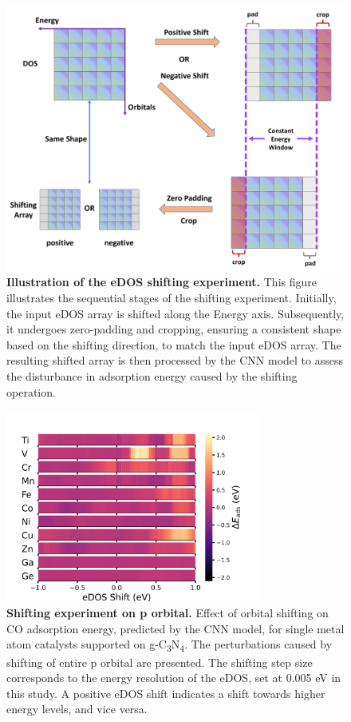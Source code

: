 \begin{figure}[htbp]
  \centering
  \includegraphics[width=\textwidth]{supp_fig30_shifting.png}
  \caption{\textbf{Illustration of the eDOS shifting experiment.}
  This figure illustrates the sequential stages of the shifting experiment.
  Initially, the input eDOS array is shifted along the Energy axis.
  Subsequently, it undergoes zero-padding and cropping,
  ensuring a consistent shape based on the shifting direction, to match the input eDOS array.
  The resulting shifted array is then processed by the CNN model to
  assess the disturbance in adsorption energy caused by the shifting operation.}
  \label{supp_fig30:shifting}
\end{figure}

\begin{figure}[htbp]
  \centering
  \includegraphics[width=0.75\textwidth]{supp_fig31_p_shifting.png}
  \caption{\textbf{Shifting experiment on p orbital.}
  Effect of orbital shifting on CO adsorption energy, predicted by the CNN model,
  for single metal atom catalysts supported on g-C\textsubscript{3}N\textsubscript{4}.
  The perturbations caused by shifting of entire p orbital are presented.
  The shifting step size corresponds to the energy resolution of the eDOS, set at 0.005 eV in this study.
  A positive eDOS shift indicates a shift towards higher energy levels, and vice versa.}
  \label{supp_fig31:p_shifting}
\end{figure}


